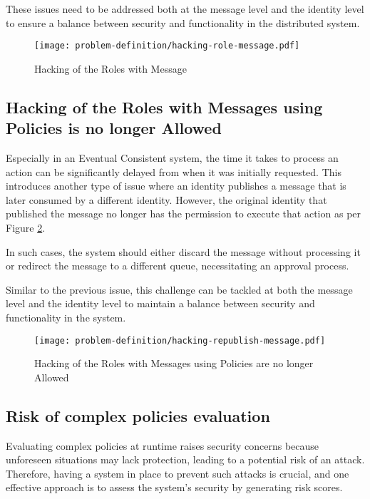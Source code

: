 These issues need to be addressed both at the message level and the identity level to ensure a balance between security and functionality in the distributed system.

\begin{figure}[h]
    \centering
    \texttt{[image: problem-definition/hacking-role-message.pdf]}
    \caption{Hacking of the Roles with Message}
    \label{fig:hacking-roles-messages}
\end{figure}

\subsection{Hacking of the Roles with Messages using Policies is no longer Allowed}
\label{sec:hacking-republish-message}


Especially in an Eventual Consistent system, the time it takes to process an action can be significantly delayed from when it was initially requested. 
This introduces another type of issue where an identity publishes a message that is later consumed by a different identity. 
However, the original identity that published the message no longer has the permission to execute that action as per Figure \ref{fig:hacking-republish-message}.

In such cases, the system should either discard the message without processing it or redirect the message to a different queue, necessitating an approval process.

Similar to the previous issue, this challenge can be tackled at both the message level and the identity level to maintain a balance between security and functionality in the system.

\begin{figure}[h]
    \centering
    \texttt{[image: problem-definition/hacking-republish-message.pdf]}
    \caption{Hacking of the Roles with Messages using Policies are no longer Allowed}
    \label{fig:hacking-republish-message}
\end{figure}

\subsection{Risk of complex policies evaluation}
\label{sec:policies-evaluation-risk}

Evaluating complex policies at runtime raises security concerns because unforeseen situations may lack protection, leading to a potential risk of an attack. 
Therefore, having a system in place to prevent such attacks is crucial, and one effective approach is to assess the system's security by generating risk scores.
